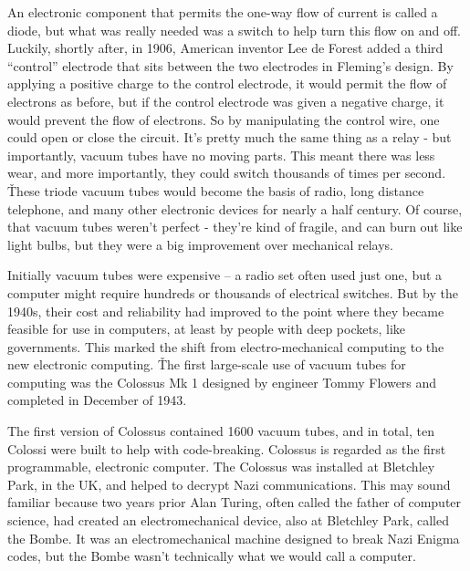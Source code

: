 An electronic component that permits the one-way flow of current is called a diode, but what was really needed was a
switch to help turn this flow on and off. Luckily, shortly after, in 1906, American inventor Lee de Forest added a
third ``control'' electrode that sits between the two electrodes in Fleming's design. By applying a positive charge
to the control electrode, it would permit the flow of electrons as before, but if the control electrode was given a
negative charge, it would prevent the flow of electrons. So by manipulating the control wire, one could open or close
the circuit. It's pretty much the same thing as a relay - but importantly, vacuum tubes have no moving parts. This
meant there was less wear, and more importantly, they could switch thousands of times per second. \v

These triode vacuum tubes would become the basis of radio, long distance telephone, and many other electronic devices
for nearly a half century. Of course, that vacuum tubes weren't perfect - they're kind of fragile, and can burn out
like light bulbs, but they were a big improvement over mechanical relays.


Initially vacuum tubes were expensive – a radio set often used just one, but a computer might require hundreds or
thousands of electrical switches. But by the 1940s, their cost and reliability had improved to the point where they
became feasible for use in computers, at least by people with deep pockets, like governments. This marked the shift
from electro-mechanical computing to the new electronic computing. \v

The first large-scale use of vacuum tubes for computing was the Colossus Mk 1 designed by engineer Tommy Flowers and
completed in December of 1943.


The first version of Colossus contained 1600 vacuum tubes, and in total, ten Colossi were built to help with
code-breaking. Colossus is regarded as the first programmable, electronic computer. The Colossus was installed at
Bletchley Park, in the UK, and helped to decrypt Nazi communications. This may sound familiar because two years prior
Alan Turing, often called the father of computer science, had created an electromechanical device, also at Bletchley
Park, called the Bombe. It was an electromechanical machine designed to break Nazi Enigma codes, but the Bombe wasn't
technically what we would call a computer.

